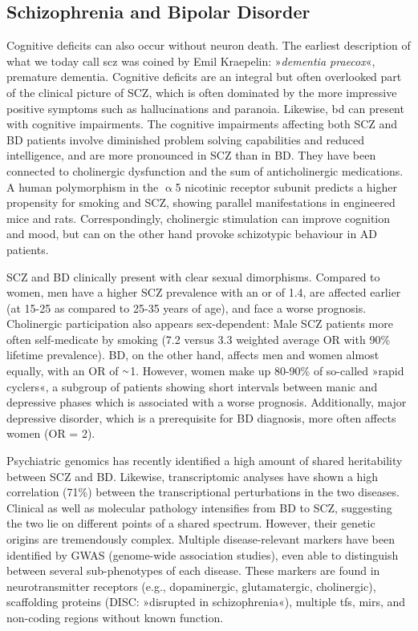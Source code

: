 \subsection{Schizophrenia and Bipolar Disorder} 
Cognitive deficits can also occur without neuron death. The earliest description of what we today call \ac{scz} was coined by Emil Kraepelin: »\emph{dementia praecox}«, premature dementia.\cite{Kraepelin1913} Cognitive deficits are an integral but often overlooked part of the clinical picture of SCZ, which is often dominated by the more impressive positive symptoms such as hallucinations and paranoia. Likewise, \ac{bd} can present with cognitive impairments. The cognitive impairments affecting both SCZ and BD patients involve diminished problem solving capabilities and reduced intelligence, and are more pronounced in SCZ than in BD.\cite{Bortolato2015} They have been connected to cholinergic dysfunction\cite{VanEnkhuizen2015, Smucny2017} and the sum of anticholinergic medications.\cite{Gray2015, Eum2017} A human polymorphism in the $\upalpha$5 nicotinic receptor subunit predicts a higher propensity for smoking and SCZ, showing parallel manifestations in engineered mice\cite{Koukouli2017} and rats.\cite{Forget2018} Correspondingly, cholinergic stimulation can improve cognition\cite{Sacco2004, Rowe2015, Lewis2017} and mood,\cite{Higley2014} but can on the other hand provoke schizotypic behaviour in AD patients.\cite{Degirmenci2016}

SCZ and BD clinically present with clear sexual dimorphisms. Compared to women, men have a higher SCZ prevalence with an \ac{or} of 1.4, are affected earlier (at 15-25 as compared to 25-35 years of age), and face a worse prognosis.\cite{Leger2016} Cholinergic participation also appears sex-dependent: Male SCZ patients more often self-medicate by smoking (7.2 versus 3.3 weighted average OR with 90\% lifetime prevalence).\cite{DeLeon2005} BD, on the other hand, affects men and women almost equally, with an OR of $\smallsim$\num{1}. However, women make up 80-90\% of so-called »rapid cyclers«, a subgroup of patients showing short intervals between manic and depressive phases which is associated with a worse prognosis.\cite{Berger2014} Additionally, major depressive disorder, which is a prerequisite for BD diagnosis, more often affects women\cite{Berger2014} (OR = 2).

Psychiatric genomics has recently identified a high amount of shared heritability between SCZ and BD.\cite{Anttila2018} Likewise, transcriptomic analyses have shown a high correlation (71\%) between the transcriptional perturbations in the two diseases.\cite{Gandal2018} Clinical as well as molecular pathology intensifies from BD to SCZ, suggesting the two lie on different points of a shared spectrum. However, their genetic origins are tremendously complex. Multiple disease-relevant markers have been identified by GWAS (genome-wide association studies), even able to distinguish between several sub-phenotypes of each disease.\cite{Ruderfer2018} These markers are found in neurotransmitter receptors (e.g., dopaminergic, glutamatergic, cholinergic), scaffolding proteins (DISC: »disrupted in schizophrenia«), multiple \acp{tf}, \acp{mir}, and non-coding regions without known function.\cite{Harrison2015, Henriksen2017, Kanazawa2017}

